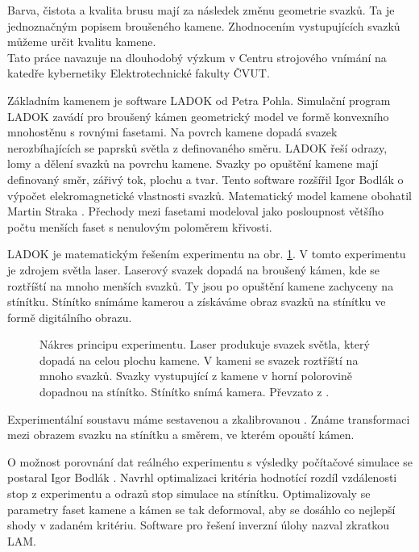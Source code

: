 Barva, čistota a kvalita brusu mají za následek změnu geometrie svazků. Ta je jednoznačným popisem broušeného kamene. Zhodnocením vystupujících svazků můžeme určit kvalitu kamene.\\ 

Tato práce navazuje na dlouhodobý výzkum v Centru strojového vnímání na katedře kybernetiky Elektrotechnické fakulty ČVUT. 

Základním kamenem je software LADOK \cite{Pohl2002} od Petra Pohla. Simulační program LADOK zavádí pro broušený kámen geometrický model ve formě konvexního mnohostěnu s rovnými fasetami. Na povrch kamene dopadá svazek nerozbíhajících se paprsků světla z definovaného směru. LADOK řeší odrazy, lomy a dělení svazků na povrchu kamene. Svazky po opuštění kamene mají definovaný směr, zářivý tok, plochu a tvar. Tento software rozšířil Igor Bodlák \cite{bodlakLADOK} o výpočet elekromagnetické vlastnosti svazků. Matematický model kamene obohatil Martin Straka \cite{strakaLADOK}. Přechody mezi fasetami modeloval jako posloupnost většího počtu menších faset s nenulovým poloměrem křivosti. 

LADOK je matematickým řešením experimentu na obr. \ref{fig:basicMeasure}. V tomto experimentu je zdrojem světla laser. Laserový svazek dopadá na broušený kámen, kde se roztříští na mnoho menších svazků. Ty jsou po opuštění kamene zachyceny na stínítku. Stínítko snímáme kamerou a získáváme obraz svazků na stínítku ve formě digitálního obrazu.  


\begin{figure}[h!]
\begin{center}
\scalebox{0.5}{ }
\end{center}
\caption{Nákres principu experimentu. Laser produkuje svazek světla, který dopadá na celou plochu kamene. V kameni se svazek roztříští na mnoho svazků. Svazky vystupující z kamene v horní polorovině dopadnou na stínítko. Stínítko snímá kamera. Převzato z \cite{Drapela}.}
\label{fig:basicMeasure}
\end{figure}


Experimentální soustavu máme sestavenou a zkalibrovanou \cite{Drapela}. Známe transformaci mezi obrazem svazku na stínítku a směrem, ve kterém opouští kámen. 

O možnost porovnání dat reálného experimentu s výsledky počítačové simulace se postaral Igor Bodlák \cite{Bodlak2005}. Navrhl optimalizaci kritéria hodnotící rozdíl vzdálenosti stop z experimentu a odrazů stop simulace na stínítku. Optimalizovaly se parametry faset kamene a kámen se tak deformoval, aby se dosáhlo co nejlepší shody v zadaném kritériu. Software pro řešení inverzní úlohy nazval zkratkou LAM. 

